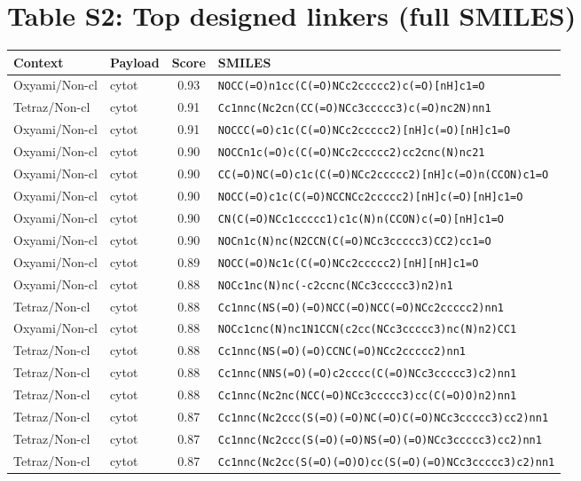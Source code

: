 \documentclass[10pt]{article}
\begin{document}
\section{Table S2: Top designed linkers (full SMILES)}
\begin{longtable}{l l c p{9cm}}\toprule
Context & Payload & Score & SMILES \\ \midrule\endhead
Oxyami/Non-cl & cytot & 0.93 & \texttt{NOCC(=O)n1cc(C(=O)NCc2ccccc2)c(=O)[nH]c1=O} \\
Tetraz/Non-cl & cytot & 0.91 & \texttt{Cc1nnc(Nc2cn(CC(=O)NCc3ccccc3)c(=O)nc2N)nn1} \\
Oxyami/Non-cl & cytot & 0.91 & \texttt{NOCCC(=O)c1c(C(=O)NCc2ccccc2)[nH]c(=O)[nH]c1=O} \\
Oxyami/Non-cl & cytot & 0.90 & \texttt{NOCCn1c(=O)c(C(=O)NCc2ccccc2)cc2cnc(N)nc21} \\
Oxyami/Non-cl & cytot & 0.90 & \texttt{CC(=O)NC(=O)c1c(C(=O)NCc2ccccc2)[nH]c(=O)n(CCON)c1=O} \\
Oxyami/Non-cl & cytot & 0.90 & \texttt{NOCC(=O)c1c(C(=O)NCCNCc2ccccc2)[nH]c(=O)[nH]c1=O} \\
Oxyami/Non-cl & cytot & 0.90 & \texttt{CN(C(=O)NCc1ccccc1)c1c(N)n(CCON)c(=O)[nH]c1=O} \\
Oxyami/Non-cl & cytot & 0.90 & \texttt{NOCn1c(N)nc(N2CCN(C(=O)NCc3ccccc3)CC2)cc1=O} \\
Oxyami/Non-cl & cytot & 0.89 & \texttt{NOCC(=O)Nc1c(C(=O)NCc2ccccc2)[nH][nH]c1=O} \\
Oxyami/Non-cl & cytot & 0.88 & \texttt{NOCc1nc(N)nc(-c2ccnc(NCc3ccccc3)n2)n1} \\
Tetraz/Non-cl & cytot & 0.88 & \texttt{Cc1nnc(NS(=O)(=O)NCC(=O)NCC(=O)NCc2ccccc2)nn1} \\
Oxyami/Non-cl & cytot & 0.88 & \texttt{NOCc1cnc(N)nc1N1CCN(c2cc(NCc3ccccc3)nc(N)n2)CC1} \\
Tetraz/Non-cl & cytot & 0.88 & \texttt{Cc1nnc(NS(=O)(=O)CCNC(=O)NCc2ccccc2)nn1} \\
Tetraz/Non-cl & cytot & 0.88 & \texttt{Cc1nnc(NNS(=O)(=O)c2cccc(C(=O)NCc3ccccc3)c2)nn1} \\
Tetraz/Non-cl & cytot & 0.88 & \texttt{Cc1nnc(Nc2nc(NCC(=O)NCc3ccccc3)cc(C(=O)O)n2)nn1} \\
Tetraz/Non-cl & cytot & 0.87 & \texttt{Cc1nnc(Nc2ccc(S(=O)(=O)NC(=O)C(=O)NCc3ccccc3)cc2)nn1} \\
Tetraz/Non-cl & cytot & 0.87 & \texttt{Cc1nnc(Nc2ccc(S(=O)(=O)NS(=O)(=O)NCc3ccccc3)cc2)nn1} \\
Tetraz/Non-cl & cytot & 0.87 & \texttt{Cc1nnc(Nc2cc(S(=O)(=O)O)cc(S(=O)(=O)NCc3ccccc3)c2)nn1} \\

\end{longtable}
\end{document}
